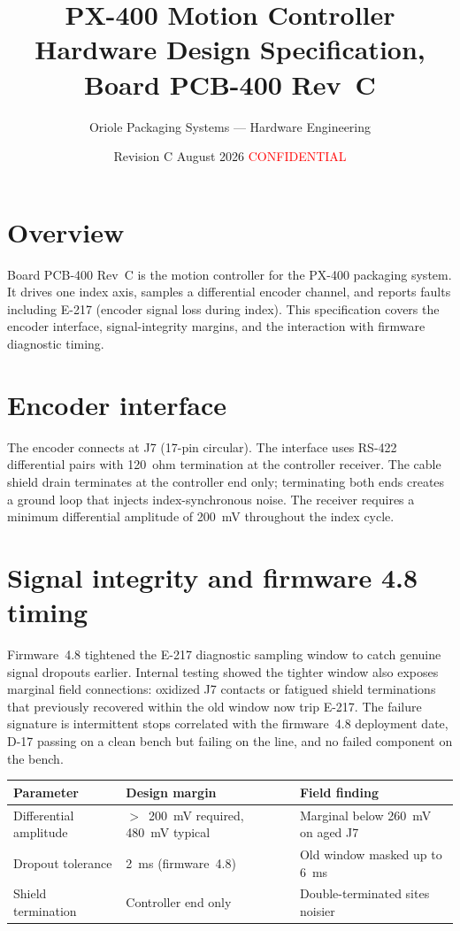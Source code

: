 \documentclass[11pt,a4paper]{article}
\title{PX-400 Motion Controller\\ \large Hardware Design Specification, Board PCB-400 Rev~C}
\author{Oriole Packaging Systems --- Hardware Engineering}
\date{Revision C \quad August 2026 \quad \textcolor{red}{CONFIDENTIAL}}
\begin{document}
\maketitle

\begin{center}
\end{center}

\section{Overview}
Board PCB-400 Rev~C is the motion controller for the PX-400 packaging system.
It drives one index axis, samples a differential encoder channel, and reports
faults including E-217 (encoder signal loss during index). This specification
covers the encoder interface, signal-integrity margins, and the interaction
with firmware diagnostic timing.

\section{Encoder interface}
The encoder connects at J7 (17-pin circular). The interface uses RS-422
differential pairs with 120~ohm termination at the controller receiver. The
cable shield drain terminates at the controller end only; terminating both ends
creates a ground loop that injects index-synchronous noise. The receiver
requires a minimum differential amplitude of 200~mV throughout the index cycle.

\section{Signal integrity and firmware 4.8 timing}
Firmware~4.8 tightened the E-217 diagnostic sampling window to catch genuine
signal dropouts earlier. Internal testing showed the tighter window also
exposes marginal field connections: oxidized J7 contacts or fatigued shield
terminations that previously recovered within the old window now trip E-217.
The failure signature is intermittent stops correlated with the firmware~4.8
deployment date, D-17 passing on a clean bench but failing on the line, and no
failed component on the bench.

\begin{table}[h]
\centering
\begin{tabular}{lll}
\toprule
Parameter & Design margin & Field finding \\
\midrule
Differential amplitude & $>$~200~mV required, 480~mV typical & Marginal below 260~mV on aged J7 \\
Dropout tolerance & 2~ms (firmware~4.8) & Old window masked up to 6~ms \\
Shield termination & Controller end only & Double-terminated sites noisier \\
\bottomrule
\end{tabular}
\end{table}
\end{document}
